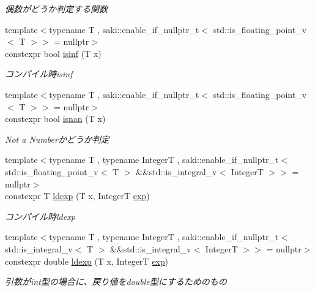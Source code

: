 \begin{DoxyCompactItemize}
\begin{DoxyCompactList}\small\item\em 偶数がどうか判定する関数 \end{DoxyCompactList}\item 
{\footnotesize template$<$typename T , saki\+::enable\+\_\+if\+\_\+nullptr\+\_\+t$<$ std\+::is\+\_\+floating\+\_\+point\+\_\+v$<$ T $>$$>$  = nullptr$>$ }\\constexpr bool \mbox{\hyperlink{namespacesaki_a2168418bb30a857d2d018d0d05c7ace0}{isinf}} (T x)
\begin{DoxyCompactList}\small\item\em コンパイル時isinf \end{DoxyCompactList}\item 
{\footnotesize template$<$typename T , saki\+::enable\+\_\+if\+\_\+nullptr\+\_\+t$<$ std\+::is\+\_\+floating\+\_\+point\+\_\+v$<$ T $>$$>$  = nullptr$>$ }\\constexpr bool \mbox{\hyperlink{namespacesaki_a446ca3f39e4dc8e57db4aafa03a4e232}{isnan}} (T x)
\begin{DoxyCompactList}\small\item\em Not a Numberかどうか判定 \end{DoxyCompactList}\item 
{\footnotesize template$<$typename T , typename IntegerT , saki\+::enable\+\_\+if\+\_\+nullptr\+\_\+t$<$ std\+::is\+\_\+floating\+\_\+point\+\_\+v$<$ T $>$ \&\&std\+::is\+\_\+integral\+\_\+v$<$ Integer\+T $>$$>$  = nullptr$>$ }\\constexpr T \mbox{\hyperlink{namespacesaki_a03b7a22945dcbce6e2bb0593025c90c4}{ldexp}} (T x, IntegerT \mbox{\hyperlink{namespacesaki_abc1268e543a60d43b04f1418f5ef3e41}{exp}})
\begin{DoxyCompactList}\small\item\em コンパイル時ldexp \end{DoxyCompactList}\item 
{\footnotesize template$<$typename T , typename IntegerT , saki\+::enable\+\_\+if\+\_\+nullptr\+\_\+t$<$ std\+::is\+\_\+integral\+\_\+v$<$ T $>$ \&\&std\+::is\+\_\+integral\+\_\+v$<$ Integer\+T $>$$>$  = nullptr$>$ }\\constexpr double \mbox{\hyperlink{namespacesaki_ad9202fb752e29a81d507ef9a0f8e8bd5}{ldexp}} (T x, IntegerT \mbox{\hyperlink{namespacesaki_abc1268e543a60d43b04f1418f5ef3e41}{exp}})
\begin{DoxyCompactList}\small\item\em 引数がint型の場合に、戻り値をdouble型にするためのもの \end{DoxyCompactList}\item 

\end{DoxyCompactItemize}
